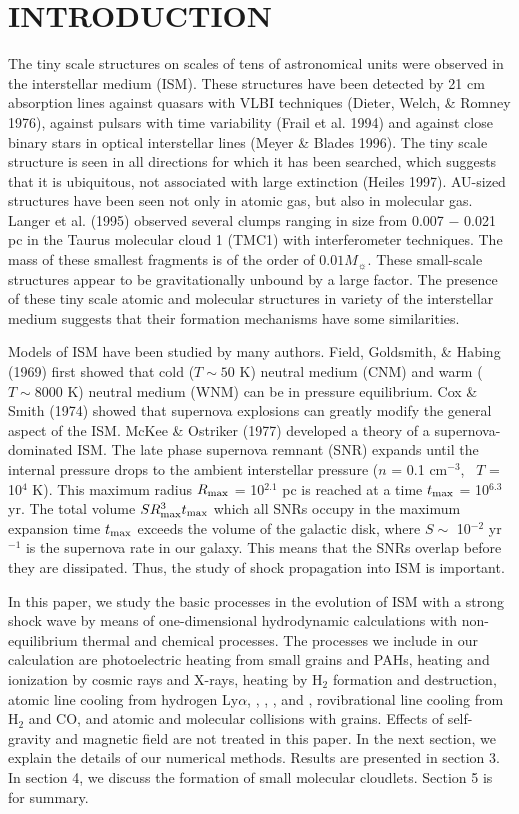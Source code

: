 \section{INTRODUCTION}
The tiny scale structures on scales of tens of astronomical units
were observed in the interstellar medium (ISM).
These structures have been detected by 21 cm absorption lines against 
quasars with VLBI techniques (Dieter, Welch, \& Romney 1976),
against pulsars with time variability (Frail et al. 1994) and
against close binary stars in optical interstellar lines
(Meyer \& Blades 1996).
The tiny scale structure is seen in all directions for which it has been 
searched, which suggests that it is ubiquitous,
not associated with large extinction (Heiles 1997).
AU-sized structures have been seen not only in atomic gas, but also
in molecular gas.
Langer et al. (1995) observed several clumps ranging in size from 
0.007 $-$ 0.021 pc 
in the Taurus molecular cloud 1 (TMC1) with interferometer techniques.
The mass of these smallest fragments is of the order of $0.01 M_{\sun}$.
These small-scale structures appear to be gravitationally unbound 
by a large factor.
The presence of these tiny scale atomic and molecular
structures in variety of the interstellar medium
suggests that their formation mechanisms have some similarities.

Models of ISM have been studied by many authors.
Field, Goldsmith, \& Habing (1969) first showed that 
cold ($T\sim 50$ K) neutral medium (CNM) and 
warm ($T\sim 8000$ K) neutral medium (WNM)
can be in pressure equilibrium.
Cox \& Smith (1974) showed that supernova explosions can greatly modify 
the general aspect of the ISM.
McKee \& Ostriker (1977) developed a theory of 
a supernova-dominated ISM.
The late phase supernova remnant (SNR) expands 
until the internal pressure drops to the
ambient interstellar pressure ($n$ = 0.1 cm$^{-3}$, \, $T$ = 10$^4$ K).
This maximum radius $R_{\rm max}$ = 10$^{2.1}$ pc is reached at a time
$t_{\rm max}$ = 10$^{6.3}$ yr.
The total volume $SR^3_{\rm max}t_{\rm max}$ which all SNRs occupy in the
maximum expansion time $t_{\rm max}$
exceeds the volume of the galactic disk,
where $S \sim$ 10$^{-2}$ yr$^{-1}$ is the supernova rate in our galaxy.
This means that the 
SNRs overlap before they are dissipated.
Thus, the study of shock propagation into ISM is important.


In this paper, we study the basic processes in the evolution of
ISM with a strong shock wave
by means of one-dimensional hydrodynamic calculations 
with non-equilibrium thermal and chemical processes. 
The processes we include in our calculation are 
photoelectric heating from small grains and PAHs, 
heating and ionization by cosmic rays and X-rays,
heating by H$_2$ formation and destruction,
atomic line cooling from hydrogen Ly$\alpha$, 
, , , and ,
rovibrational line cooling from H$_2$ and CO, 
and atomic and molecular collisions with grains.
Effects of self-gravity and magnetic field are not treated in this paper.
In the next section, we explain the details of our numerical methods.
Results are presented in section 3.
In section 4, we discuss the formation of small molecular cloudlets.
Section 5 is for summary.

